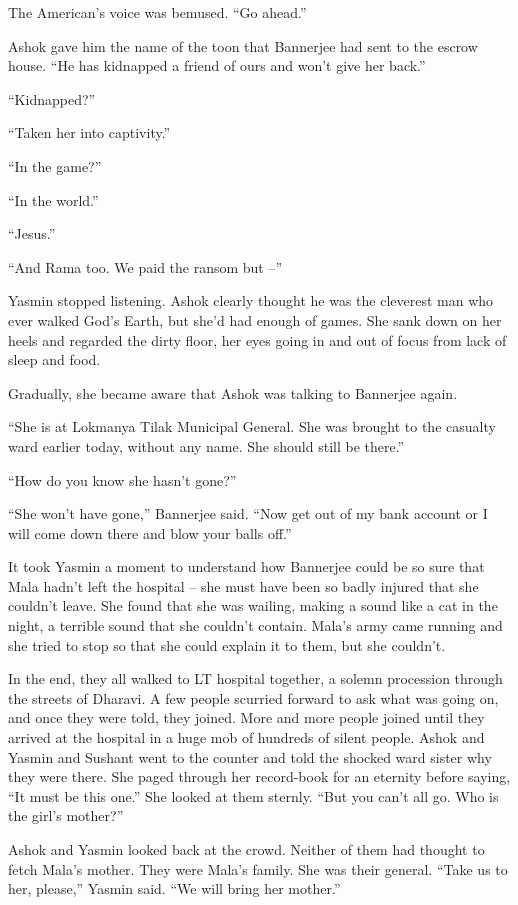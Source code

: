 The American's voice was bemused. ``Go ahead.''

Ashok gave him the name of the toon that Bannerjee had sent to the
escrow house. ``He has kidnapped a friend of ours and won't give her
back.''

``Kidnapped?''

``Taken her into captivity.''

``In the game?''

``In the world.''

``Jesus.''

``And Rama too. We paid the ransom but --''

Yasmin stopped listening. Ashok clearly thought he was the
cleverest man who ever walked God's Earth, but she'd had enough of
games. She sank down on her heels and regarded the dirty floor, her
eyes going in and out of focus from lack of sleep and food.

Gradually, she became aware that Ashok was talking to Bannerjee
again.

``She is at Lokmanya Tilak Municipal General. She was brought to the
casualty ward earlier today, without any name. She should still be
there.''

``How do you know she hasn't gone?''

``She won't have gone,'' Bannerjee said. ``Now get out of my bank
account or I will come down there and blow your balls off.''

It took Yasmin a moment to understand how Bannerjee could be so
sure that Mala hadn't left the hospital -- she must have been so
badly injured that she couldn't leave. She found that she was
wailing, making a sound like a cat in the night, a terrible sound
that she couldn't contain. Mala's army came running and she tried
to stop so that she could explain it to them, but she couldn't.

In the end, they all walked to LT hospital together, a solemn
procession through the streets of Dharavi. A few people scurried
forward to ask what was going on, and once they were told, they
joined. More and more people joined until they arrived at the
hospital in a huge mob of hundreds of silent people. Ashok and
Yasmin and Sushant went to the counter and told the shocked ward
sister why they were there. She paged through her record-book for
an eternity before saying, ``It must be this one.'' She looked at
them sternly. ``But you can't all go. Who is the girl's mother?''

Ashok and Yasmin looked back at the crowd. Neither of them had
thought to fetch Mala's mother. They were Mala's family. She was
their general. ``Take us to her, please,'' Yasmin said. ``We will
bring her mother.''

